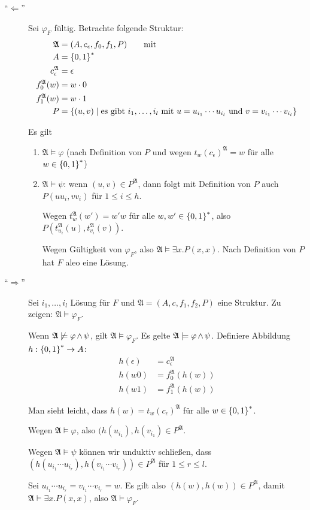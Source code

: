 \begin{description}
  \item[\enquote{$\Leftarrow$}]
  Sei $\varphi_F$ fültig. Betrachte folgende Struktur:
  \begin{align*}
    \mathfrak{A} &= (A, c_\epsilon, f_0, f_1, P) \qquad\text{mit} \\
    A &= \left\{0,1\right\}^*\\
    c_\epsilon^{\mathfrak{A}} &= \epsilon\\
    f_0^{\mathfrak{A}}(w) &= w \cdot 0\\
    f_1^{\mathfrak{A}}(w) &= w \cdot 1\\
    P &= \left\{(u,v) \mid \text{es gibt $i_1,\dots,i_l$ mit $u=u_{i_1}\cdots u_{i_l}$ und $v=v_{i_1}\cdots v_{i_l}$}\right\}
  \end{align*}
  
  Es gilt
  \begin{enumerate}
    \item $\mathfrak{A} \models \varphi$ (nach Definition von $P$ und wegen $t_w(c_\epsilon)^{\mathfrak{A}}=w$ für alle $w\in\left\{0,1\right\}^*$)
    \item $\mathfrak{A} \models \psi$: wenn $(u,v)\in P^{\mathfrak{A}}$, dann folgt mit Definition von $P$ auch $P(uu_i, vv_i)$ für $1\leq i\leq h$.
    
    Wegen $t_w^\mathfrak{A}(w') = w'w$ für alle $w,w'\in\left\{0,1\right\}^*$, also $P(t_{u_i}^\mathfrak{A}(u), t_{v_i}^\mathfrak{A}(v))$.

    Wegen Gültigkeit von $\varphi_F$, also $\mathfrak{A} \models \exists x.P(x,x)$. Nach Definition von $P$ hat $F$ aleo eine Lösung.
  \end{enumerate}
  
  \item[\enquote{$\Rightarrow$}]
  Sei $i_1,\dots,i_l$ Lösung für $F$ und $\mathfrak{A} = (A, c, f_1, f_2, P)$ eine Struktur. Zu zeigen: $\mathfrak{A}\models\varphi_F$.
  
  Wenn $\mathfrak{A}\not\models \varphi\operatorname{\wedge}\psi$, gilt $\mathfrak{A}\models\varphi_F$. Es gelte $\mathfrak{A}\models\varphi\operatorname{\wedge}\psi$.
  Definiere Abbildung $h : \left\{0,1\right\}^* \rightarrow A$:
  \begin{align*}
    h(\epsilon) &= c_\epsilon^\mathfrak{A}\\
    h(w0) &= f_0^{\mathfrak{A}}(h(w))\\
    h(w1) &= f_1^{\mathfrak{A}}(h(w))
  \end{align*}
  
  Man sieht leicht, dass $h(w)=t_w(c_\epsilon)^\mathfrak{A}$ für alle $w\in\left\{0,1\right\}^*$.
  
  Wegen $\mathfrak{A} \models \varphi$, also $(h(u_{i_1}), h(v_{i_1}) \in P^{\mathfrak{A}}$.
  
  Wegen $\mathfrak{A} \models \psi$ können wir unduktiv schließen, dass $(h(u_{i_1}\cdots u_{i_r}), h(v_{i_1}\cdots v_{i_r}))\in P^{\mathfrak{A}}$ für $1\leq r\leq l$.
  
  Sei $u_{i_1}\cdots u_{i_r} = v_{i_1}\cdots v_{i_r} = w$. Es gilt also $(h(w),h(w)) \in P^{\mathfrak{A}}$, damit $\mathfrak{A} \models \exists x.P(x,x)$, also $\mathfrak{A}\models\varphi_F$.
\end{description}



